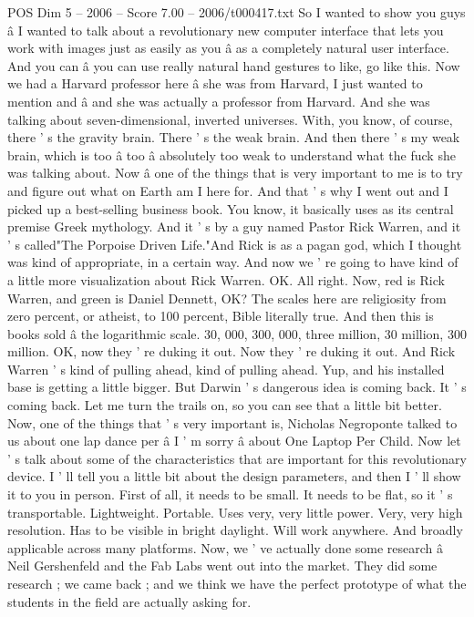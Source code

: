 \begin{textsample}{POS Dim 5 – 2006 – Score 7.00 – 2006/t000417.txt}
So I wanted to show you guys â I wanted to talk about a revolutionary new computer interface that lets you work with images just as easily as you â as a completely natural user interface.
And you can â you can use really natural hand gestures to like, go like this.
Now we had a Harvard professor here â she was from Harvard, I just wanted to mention and â and she was actually a professor from Harvard.
And she was talking about seven-dimensional, inverted universes.
With, you know, of course, there ' s the gravity brain.
There ' s the weak brain.
And then there ' s my weak brain, which is too â too â absolutely too weak to understand what the fuck she was talking about.
Now â one of the things that is very important to me is to try and figure out what on Earth am I here for.
And that ' s why I went out and I picked up a best-selling business book.
You know, it basically uses as its central premise Greek mythology.
And it ' s by a guy named Pastor Rick Warren, and it ' s called"The Porpoise Driven Life."And Rick is as a pagan god, which I thought was kind of appropriate, in a certain way.
And now we ' re going to have kind of a little more visualization about Rick Warren.
OK.
All right.
Now, red is Rick Warren, and green is Daniel Dennett, OK?
The scales here are religiosity from zero percent, or atheist, to 100 percent, Bible literally true.
And then this is books sold â the logarithmic scale. 30, 000, 300, 000, three million, 30 million, 300 million.
OK, now they ' re duking it out.
Now they ' re duking it out.
And Rick Warren ' s kind of pulling ahead, kind of pulling ahead.
Yup, and his installed base is getting a little bigger.
But Darwin ' s dangerous idea is coming back.
It ' s coming back.
Let me turn the trails on, so you can see that a little bit better.
Now, one of the things that ' s very important is, Nicholas Negroponte talked to us about one lap dance per â I ' m sorry â about One Laptop Per Child.
Now let ' s talk about some of the characteristics that are important for this revolutionary device.
I ' ll tell you a little bit about the design parameters, and then I ' ll show it to you in person.
First of all, it needs to be small.
It needs to be flat, so it ' s transportable.
Lightweight.
Portable.
Uses very, very little power.
Very, very high resolution.
Has to be visible in bright daylight.
Will work anywhere.
And broadly applicable across many platforms.
Now, we ' ve actually done some research â Neil Gershenfeld and the Fab Labs went out into the market.
They did some research ; we came back ; and we think we have the perfect prototype of what the students in the field are actually asking for.

\end{textsample}
